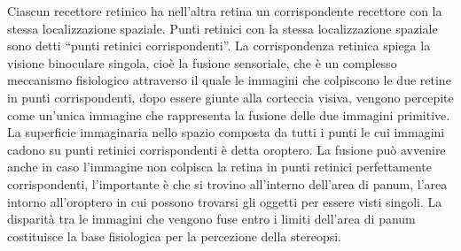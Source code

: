 Ciascun recettore retinico ha nell’altra retina un corrispondente recettore con la stessa localizzazione spaziale. Punti retinici con la stessa localizzazione spaziale sono detti “punti retinici corrispondenti”. La corrispondenza retinica spiega la visione binoculare singola, cioè la fusione sensoriale, che è un complesso meccanismo fisiologico attraverso il quale le immagini che colpiscono le due retine in punti corrispondenti, dopo essere giunte alla corteccia visiva, vengono percepite come un’unica immagine che rappresenta la fusione delle due immagini primitive. La superficie immaginaria nello spazio composta da tutti i punti le cui immagini cadono su punti retinici corrispondenti è detta oroptero. La fusione può avvenire anche in caso l’immagine non colpisca la retina in punti retinici perfettamente corrispondenti, l’importante è che si trovino all’interno dell’area di panum, l’area intorno all’oroptero in cui possono trovarsi gli oggetti per essere visti singoli. La disparità tra le immagini che vengono fuse entro i limiti dell’area di panum costituisce la base fisiologica per la percezione della stereopsi.

